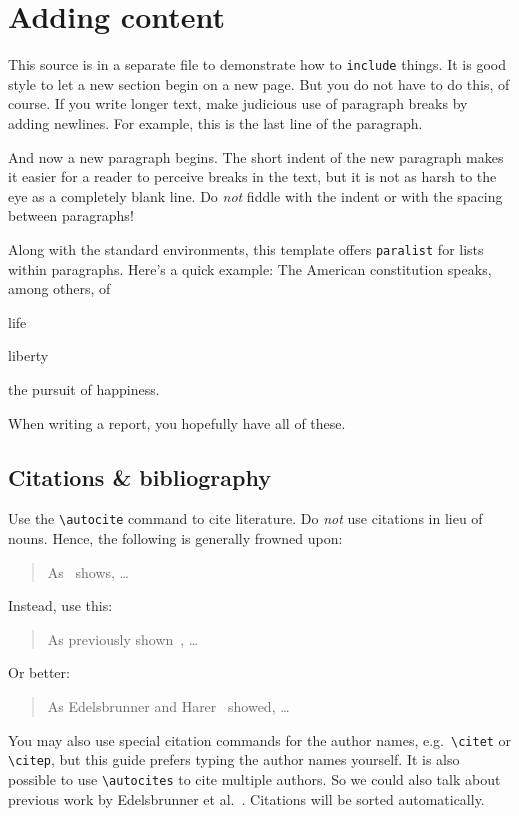 \section{Adding content}

This source is in a separate file to demonstrate how to \verb|include|
things. It is good style to let a new section begin on a new page. But
you do not have to do this, of course. If you write longer text, make
judicious use of paragraph breaks by adding newlines. For example, this
is the last line of the paragraph.

And now a new paragraph begins. The short indent of the new paragraph
makes it easier for a reader to perceive breaks in the text, but it is
not as harsh to the eye as a completely blank line. Do \emph{not} fiddle
with the indent or with the spacing between paragraphs!

Along with the standard environments, this template offers
\verb|paralist| for lists within paragraphs.
%
Here's a quick example: The American constitution speaks, among others, of
%
\begin{inparaenum}[(i)]
  \item life
  \item liberty
  \item the pursuit of happiness.
\end{inparaenum}
%
When writing a report, you hopefully have all of these.

\subsection{Citations \& bibliography}

Use the \verb|\autocite| command to cite literature. Do \emph{not} use
citations in lieu of nouns. Hence, the following is generally frowned
upon:
%
\begin{quote}
  As~\autocite{Edelsbrunner10} shows, \dots
\end{quote}
%
Instead, use this:
%
\begin{quote}
  As previously shown~\autocite{Edelsbrunner10}, \dots
\end{quote}
%
Or better:
%
\begin{quote}
  As Edelsbrunner and Harer~\autocite{Edelsbrunner10} showed, \dots
\end{quote}
%
You may also use special citation commands for the author names, e.g.\
\verb|\citet| or \verb|\citep|, but this guide prefers typing the author
names yourself.
%
It is also possible to use \verb|\autocites| to cite multiple authors.
So we could also talk about previous work by Edelsbrunner et
al.~\autocites{Edelsbrunner10, Edelsbrunner02}. Citations will be sorted
automatically.

